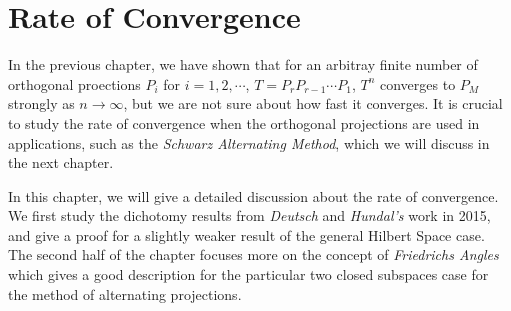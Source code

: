 \chapter{Rate of Convergence}\label{chapt:rate of convergence}
In the previous chapter, we have shown that for an arbitray finite number of orthogonal proections $P_{i}$ for $i=1,2,\cdots$, $T=P_{r}P_{r-1}\cdots P_{1}$, $T^n$ converges to $P_{M}$ strongly as $n\rightarrow \infty$, but we are not sure about how fast it converges. It is crucial to study the rate of convergence when the orthogonal projections are used in applications, such as the \emph{Schwarz Alternating Method}, which we will discuss in the next chapter.


In this chapter, we will give a detailed discussion about the rate of convergence. We first study the dichotomy results from \emph{Deutsch} and \emph{Hundal's} work\cite{DH15} in 2015, and give a proof for a slightly weaker result of the general Hilbert Space case. The second half of the chapter focuses more on the concept of \emph{Friedrichs Angles} which gives a good description for the particular two closed subspaces case for the method of alternating projections.